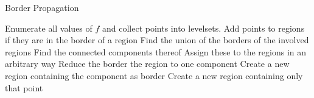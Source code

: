 \documentclass[a4paper,10pt,notitlepage,fullpage]{paper}
\theoremstyle{plain}
\theoremstyle{definition}
\begin{document}
\begin{algorithm}
\caption{Border Propagation}
\begin{algorithmic}
\State Enumerate all values of $f$ and collect points into levelsets.
    \State Add points to regions if they are in the border of a region
        \State Find the union of the borders of the involved regions
        \State Find the connected components thereof
        \State Assign these to the regions in an arbitrary way
	\EndIf
        \State Reduce the border the region to one component
            \State Create a new region containing the component as border
		\EndFor
    \EndIf
        \State Create a new region containing only that point
	\EndFor
\EndFor
\end{algorithmic}
\end{algorithm}
\end{document}
